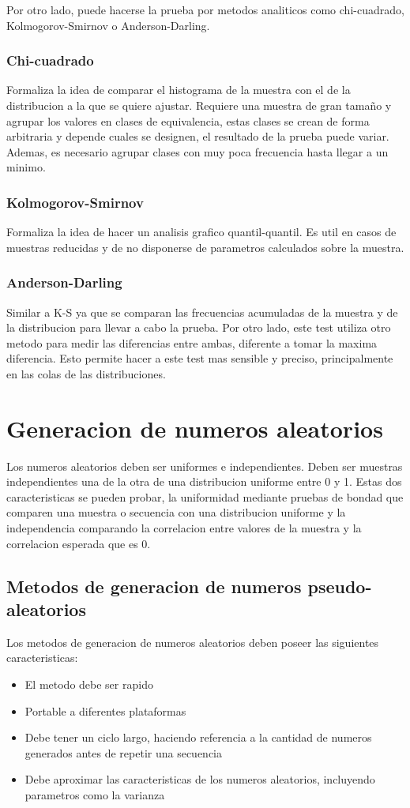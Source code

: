 \documentclass[a4paper]{article}
\begin{document}
Por otro lado, puede hacerse la prueba por metodos analiticos como chi-cuadrado, Kolmogorov-Smirnov o Anderson-Darling.
\subsubsection*{Chi-cuadrado}
Formaliza la idea de comparar el histograma de la muestra con el de la distribucion a la que se quiere ajustar.
Requiere una muestra de gran tamaño y agrupar los valores en clases de equivalencia, estas clases se crean de forma 
arbitraria y depende cuales se designen, el resultado de la prueba puede variar. Ademas, es necesario agrupar clases
con muy poca frecuencia hasta llegar a un minimo.

\subsubsection*{Kolmogorov-Smirnov}
Formaliza la idea de hacer un analisis grafico quantil-quantil.
Es util en casos de muestras reducidas y de no disponerse de parametros calculados sobre la muestra.

\subsubsection*{Anderson-Darling}
Similar a K-S ya que se comparan las frecuencias acumuladas de la muestra y de la distribucion para llevar a cabo
la prueba. Por otro lado, este test utiliza otro metodo para medir las diferencias entre ambas, diferente a tomar
la maxima diferencia. Esto permite hacer a este test mas sensible y preciso, principalmente en las colas de las 
distribuciones.


\section{Generacion de numeros aleatorios} 
Los numeros aleatorios deben ser uniformes e independientes. Deben ser muestras independientes una
de la otra de una distribucion uniforme entre 0 y 1.
Estas dos caracteristicas se pueden probar, la uniformidad mediante pruebas de bondad que comparen una muestra o
secuencia con una distribucion uniforme y la independencia comparando la correlacion entre valores de la muestra y 
la correlacion esperada que es 0.

\subsection*{Metodos de generacion de numeros pseudo-aleatorios}
Los metodos de generacion de numeros aleatorios deben poseer las siguientes caracteristicas:
\begin{itemize}
    \item El metodo debe ser rapido
    \item Portable a diferentes plataformas
    \item Debe tener un ciclo largo, haciendo referencia a la cantidad de numeros generados antes de repetir una 
    secuencia
    \item Debe aproximar las caracteristicas de los numeros aleatorios, incluyendo parametros como la varianza
\end{itemize}
\end{document}
